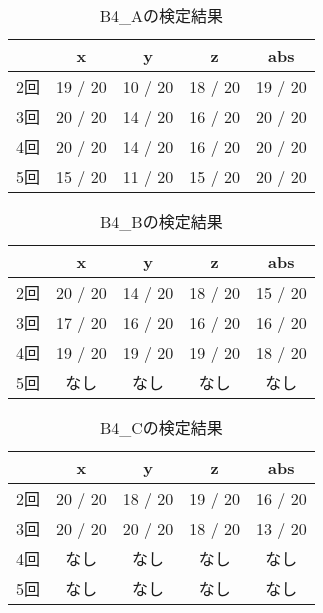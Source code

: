 \clearpage
\begin{table}[tb]
    \caption{B4_Aの検定結果}
    \vspace{0.5cm}
    \centering
    \begin{tabular}{|c|c|c|c|c|}
        \hline
        \diagbox{}{} & x & y & z & abs \\\hline
        2回 & 19 / 20 & 10 / 20 & 18 / 20 & 19 / 20 \\
        3回 & 20 / 20 & 14 / 20 & 16 / 20 & 20 / 20 \\
        4回 & 20 / 20 & 14 / 20 & 16 / 20 & 20 / 20 \\
        5回 & 15 / 20 & 11 / 20 & 15 / 20 & 20 / 20 \\
        \hline
    \end{tabular}
\end{table}
\begin{table}[tb]
    \caption{B4_Bの検定結果}
    \vspace{0.5cm}
    \centering
    \begin{tabular}{|c|c|c|c|c|}
        \hline
        \diagbox{}{} & x & y & z & abs \\\hline
        2回 & 20 / 20 & 14 / 20 & 18 / 20 & 15 / 20 \\
        3回 & 17 / 20 & 16 / 20 & 16 / 20 & 16 / 20 \\
        4回 & 19 / 20 & 19 / 20 & 19 / 20 & 18 / 20 \\
        5回 & なし & なし & なし & なし \\
        \hline
    \end{tabular}
\end{table}
\begin{table}[tb]
    \caption{B4_Cの検定結果}
    \vspace{0.5cm}
    \centering
    \begin{tabular}{|c|c|c|c|c|}
        \hline
        \diagbox{}{} & x & y & z & abs \\\hline
        2回 & 20 / 20 & 18 / 20 & 19 / 20 & 16 / 20 \\
        3回 & 20 / 20 & 20 / 20 & 18 / 20 & 13 / 20 \\
        4回 & なし & なし & なし & なし \\
        5回 & なし & なし & なし & なし \\
        \hline
    \end{tabular}
\end{table}
